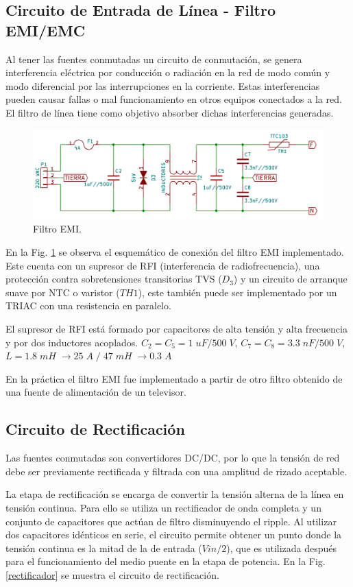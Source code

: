 \documentclass[11pt, a4paper]{article}
\begin{document}
\subsection{Circuito de Entrada de Línea - Filtro EMI/EMC}
Al tener las fuentes conmutadas un circuito de conmutación, se genera interferencia eléctrica por conducción o radiación en la red de modo común y modo diferencial por las interrupciones en la corriente. Estas interferencias pueden causar fallas o mal funcionamiento en otros equipos conectados a la red. El filtro de línea tiene como objetivo absorber dichas interferencias generadas.
\begin{figure}[h]
	\centering
	\includegraphics[width = 12 cm]{Imagenes/emi}
	\caption{Filtro EMI.}
	\label{emi}
\end{figure}

En la Fig. \ref{emi} se observa el esquemático de conexión del filtro EMI implementado. Este cuenta con un supresor de RFI (interferencia de radiofrecuencia), una protección contra sobretensiones transitorias TVS ($D_3$) y un circuito de arranque suave por NTC o varistor ($TH1$), este también puede ser implementado por un TRIAC con una resistencia en paralelo.

El supresor de RFI está formado por capacitores de alta tensión y alta frecuencia y por dos inductores acoplados. $C_2 = C_5 = 1 \; uF / 500 \; V$, $C_7 = C_8 = 3.3 \; nF / 500 \; V$, $L = 1.8 \; mH \; \rightarrow 25 \; A \;/\; 47 \;mH \; \rightarrow 0.3 \; A$

En la práctica el filtro EMI fue implementado a partir de otro filtro obtenido de una fuente de alimentación de un televisor.

\subsection{Circuito de Rectificación}
Las fuentes conmutadas son convertidores DC/DC, por lo que la tensión de red debe ser previamente rectificada y filtrada con una amplitud de rizado aceptable.

La etapa de rectificación se encarga de convertir la tensión alterna de la línea en tensión continua. Para ello se utiliza un rectificador de onda completa y un conjunto de capacitores que actúan de filtro disminuyendo el ripple. Al utilizar dos capacitores idénticos en serie, el circuito permite obtener un punto donde la tensión continua es la mitad de la de entrada ($Vin/2$), que es utilizada después para el funcionamiento del medio puente en la etapa de potencia. En la Fig. \ref{rectificador} se muestra el circuito de rectificación.
\end{document}

